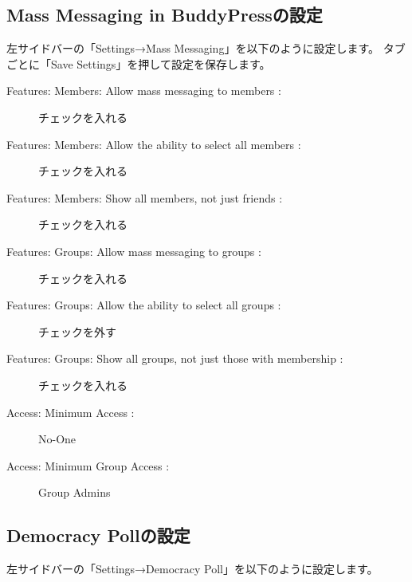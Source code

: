 \documentclass[titlepage,10pt,a4paper,uplatex]{jsbook}
\begin{document}
\subsection{Mass Messaging in BuddyPressの設定}

左サイドバーの「Settings→Mass Messaging」を以下のように設定します。
タブごとに「Save Settings」を押して設定を保存します。

\begin{description}
\item[Features: Members: Allow mass messaging to members : ] チェックを入れる
\item[Features: Members: Allow the ability to select all members : ] チェックを入れる
\item[Features: Members: Show all members, not just friends : ] チェックを入れる
\item[Features: Groups: Allow mass messaging to groups : ] チェックを入れる
\item[Features: Groups: Allow the ability to select all groups : ] チェックを外す
\item[Features: Groups: Show all groups, not just those with membership : ] チェックを入れる
\item[Access: Minimum Access : ] No-One
\item[Access: Minimum Group Access : ] Group Admins
\end{description}

\subsection{Democracy Pollの設定}

左サイドバーの「Settings→Democracy Poll」を以下のように設定します。
\end{document}
